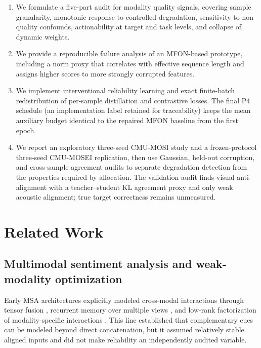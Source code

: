 \begin{enumerate}
\def\labelenumi{\arabic{enumi}.}
\tightlist
\item
  We formulate a five-part audit for modality quality signals, covering
  sample granularity, monotonic response to controlled degradation,
  sensitivity to non-quality confounds, actionability at target and task
  levels, and collapse of dynamic weights.
\item
  We provide a reproducible failure analysis of an MFON-based prototype,
  including a norm proxy that correlates with effective sequence length
  and assigns higher scores to more strongly corrupted features.
\item
  We implement interventional reliability learning and exact
  finite-batch redistribution of per-sample distillation and contrastive
  losses. The final P4 schedule (an implementation label retained for
  traceability) keeps the mean auxiliary budget
  identical to the repaired MFON baseline from the first epoch.
\item
  We report an exploratory three-seed CMU-MOSI study and a frozen-protocol
  three-seed CMU-MOSEI replication, then use Gaussian, held-out corruption,
  and cross-sample agreement audits to separate degradation detection
  from the properties required by allocation. The validation audit finds
  visual anti-alignment with a teacher--student KL agreement proxy and only
  weak acoustic alignment; true target correctness remains unmeasured.
\end{enumerate}

\section{Related Work}\label{related-work}

\subsection{Multimodal sentiment analysis and weak-modality
optimization}\label{multimodal-sentiment-analysis-and-weak-modality-optimization}

Early MSA architectures explicitly modeled cross-modal interactions
through tensor fusion \cite{zadeh2017tensor}, recurrent memory over
multiple views \cite{zadeh2018memory}, and low-rank factorization of
modality-specific interactions \cite{liu2018efficient}. This line
established that complementary cues can be modeled beyond direct
concatenation, but it assumed relatively stable aligned inputs and did
not make reliability an independently audited variable.


